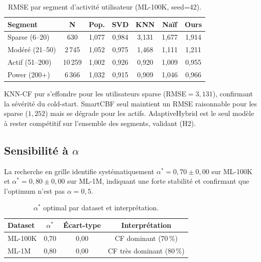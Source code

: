 \documentclass[conference]{IEEEtran}
\begin{document}
\begin{table}[!t]
\renewcommand{\arraystretch}{1.15}
\caption{RMSE par segment d'activité utilisateur (ML-100K, seed=42).}
\label{tab:segments}
\centering
\setlength{\tabcolsep}{4pt}
\begin{tabular}{@{}lcccccc@{}}
\toprule
\textbf{Segment} & \textbf{N} & \textbf{Pop.} & \textbf{SVD} & \textbf{KNN} & \textbf{Naïf} & \textbf{Ours} \\
\midrule
Sparse (6--20)   & 630    & 1,077 & 0,984 & 3,131 & 1,677 & 1,914 \\
Modéré (21--50)  & 2\,745 & 1,052 & 0,975 & 1,468 & 1,111 & 1,211 \\
Actif (51--200)  & 10\,259 & 1,002 & 0,926 & 0,920 & 1,009 & 0,955 \\
Power (200+)     & 6\,366 & 1,032 & 0,915 & 0,909 & 1,046 & 0,966 \\
\bottomrule
\end{tabular}
\end{table}

KNN-CF pur s'effondre pour les utilisateurs sparse (RMSE$=3{,}131$), confirmant
la sévérité du cold-start. SmartCBF seul maintient un RMSE raisonnable pour
les sparse ($1{,}252$) mais se dégrade pour les actifs. AdaptiveHybrid est
le seul modèle à rester compétitif sur l'ensemble des segments, validant (H2).

\subsection{Sensibilité à $\alpha$}

La recherche en grille identifie systématiquement $\alpha^* = 0{,}70 \pm 0{,}00$
sur ML-100K et $\alpha^* = 0{,}80 \pm 0{,}00$ sur ML-1M, indiquant une forte
stabilité et confirmant que l'optimum n'est pas $\alpha=0{,}5$.

\begin{table}[!t]
\renewcommand{\arraystretch}{1.2}
\caption{$\alpha^*$ optimal par dataset et interprétation.}
\label{tab:alpha}
\centering
\begin{tabular}{@{}lccc@{}}
\toprule
\textbf{Dataset} & \textbf{$\alpha^*$} & \textbf{Écart-type} & \textbf{Interprétation} \\
\midrule
ML-100K & 0,70 & 0,00 & CF dominant (70\,\%) \\
ML-1M   & 0,80 & 0,00 & CF très dominant (80\,\%) \\
\bottomrule
\end{tabular}
\end{table}
\end{document}

